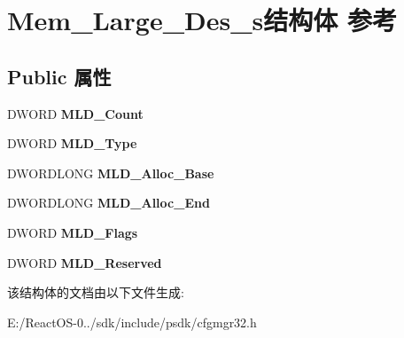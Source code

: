 \hypertarget{struct_mem___large___des__s}{}\section{Mem\+\_\+\+Large\+\_\+\+Des\+\_\+s结构体 参考}
\label{struct_mem___large___des__s}
\subsection*{Public 属性}
\begin{DoxyCompactItemize}
\item 
\mbox{\label{struct_mem___large___des__s_a1d288d7f1596261ad5d5c84fc6806f0f}} 
D\+W\+O\+RD {\bfseries M\+L\+D\+\_\+\+Count}
\item 
\mbox{\label{struct_mem___large___des__s_a05cafd9aa7c1d6e3909dec5ffa646c21}} 
D\+W\+O\+RD {\bfseries M\+L\+D\+\_\+\+Type}
\item 
\mbox{\label{struct_mem___large___des__s_a195bae2f717c64fd9b471b40c7564107}} 
D\+W\+O\+R\+D\+L\+O\+NG {\bfseries M\+L\+D\+\_\+\+Alloc\+\_\+\+Base}
\item 
\mbox{\label{struct_mem___large___des__s_a06edfeebf326515a8f3781b03775edaf}} 
D\+W\+O\+R\+D\+L\+O\+NG {\bfseries M\+L\+D\+\_\+\+Alloc\+\_\+\+End}
\item 
\mbox{\label{struct_mem___large___des__s_a144cfed6aec4dce648bc24f8ace9350e}} 
D\+W\+O\+RD {\bfseries M\+L\+D\+\_\+\+Flags}
\item 
\mbox{\label{struct_mem___large___des__s_acb6c2fb9d92c6a28815c8d03b794a55f}} 
D\+W\+O\+RD {\bfseries M\+L\+D\+\_\+\+Reserved}
\end{DoxyCompactItemize}


该结构体的文档由以下文件生成\+:\begin{DoxyCompactItemize}
\item 
E\+:/\+React\+O\+S-\/0../sdk/include/psdk/cfgmgr32.\+h\end{DoxyCompactItemize}
